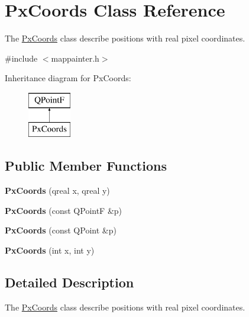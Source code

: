 \hypertarget{class_px_coords}{}\section{Px\+Coords Class Reference}
\label{class_px_coords}


The \hyperlink{class_px_coords}{Px\+Coords} class describe positions with real pixel coordinates.  




{\ttfamily \#include $<$mappainter.\+h$>$}

Inheritance diagram for Px\+Coords\+:\begin{figure}[H]
\begin{center}
\leavevmode
\includegraphics[height=2.000000cm]{class_px_coords}
\end{center}
\end{figure}
\subsection*{Public Member Functions}
\begin{DoxyCompactItemize}
\item 
\hypertarget{class_px_coords_af7f17b5bb6fa3261162b4fb5df854236}{}\label{class_px_coords_af7f17b5bb6fa3261162b4fb5df854236} 
{\bfseries Px\+Coords} (qreal x, qreal y)
\item 
\hypertarget{class_px_coords_a589dea0fc7f89609399528ce47788b74}{}\label{class_px_coords_a589dea0fc7f89609399528ce47788b74} 
{\bfseries Px\+Coords} (const Q\+PointF \&p)
\item 
\hypertarget{class_px_coords_ad38e146a7d9908ac31ddae47a1b765ff}{}\label{class_px_coords_ad38e146a7d9908ac31ddae47a1b765ff} 
{\bfseries Px\+Coords} (const Q\+Point \&p)
\item 
\hypertarget{class_px_coords_a258b2927d40dc866bfbdd0d02a0afa31}{}\label{class_px_coords_a258b2927d40dc866bfbdd0d02a0afa31} 
{\bfseries Px\+Coords} (int x, int y)
\end{DoxyCompactItemize}


\subsection{Detailed Description}
The \hyperlink{class_px_coords}{Px\+Coords} class describe positions with real pixel coordinates. 

